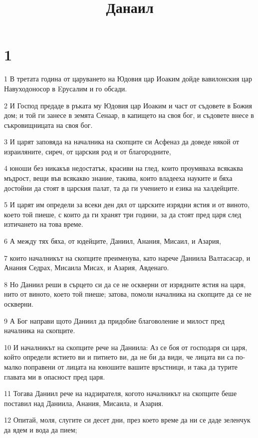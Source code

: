 

\title{Данаил}


\chapter{1}

\par 1 В третата година от царуването на Юдовия цар Иоаким дойде вавилонския цар Навуходоносор в Eрусалим и го обсади.
\par 2 И Господ предаде в ръката му Юдовия цар Иоаким и част от съдовете в Божия дом; и той ги занесе в земята Сенаар, в капището на своя бог, и съдовете внесе в съкровищницата на своя бог.
\par 3 И царят заповяда на началника на скопците си Асфеназ да доведе някой от израиляните, сиреч, от царския род и от благородните,
\par 4 юноши без никакъв недостатък, красиви на глед, които проумяваха всякаква мъдрост, вещи във всякакво знание, такива, които владееха науките и бяха достойни да стоят в царския палат, та да ги учението и езика на халдейците.
\par 5 И царят им определи за всеки ден дял от царските изрядни ястия и от виното, което той пиеше, с които да ги хранят три години, за да стоят пред царя след изтичането на това време.
\par 6 А между тях бяха, от юдейците, Даниил, Анания, Мисаил, и Азария,
\par 7 които началникът на скопците преименува, като нарече Даниила Валтасасар, и Анания Седрах, Мисаила Мисах, и Азария, Авденаго.
\par 8 Но Даниил реши в сърцето си да се не оскверни от изрядните ястия на царя, нито от виното, което той пиеше; затова, помоли началника на скопците да се не оскверни.
\par 9 А Бог направи щото Даниил да придобие благоволение и милост пред началника на скопците.
\par 10 И началникът на скопците рече на Даниила: Аз се боя от господаря си царя, който определи ястието ви и питието ви, да не би да види, че лицата ви са по-малко поправени от лицата на юношите вашите връстници, и така да турите главата ми в опасност пред царя.
\par 11 Тогава Даниил рече на надзирателя, когото началникът на скопците беше поставил над Даниила, Анания, Мисаила, и Азария.
\par 12 Опитай, моля, слугите си десет дни, през което време да ни се даде зеленчук да ядем и вода да пием;
